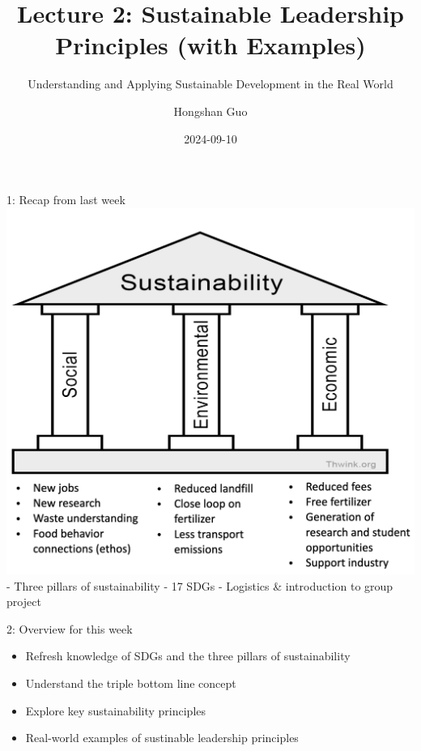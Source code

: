 \documentclass[
  ignorenonframetext,
]{beamer}
\title{Lecture 2: Sustainable Leadership Principles (with Examples)}
\subtitle{Understanding and Applying Sustainable Development in the Real
World}
\author{Hongshan Guo}
\date{2024-09-10}
\providecommand{\tightlist}{%
  \setlength{\itemsep}{0pt}\setlength{\parskip}{0pt}}\usepackage{longtable,booktabs,array}
\begin{document}
\frame{\titlepage}

\begin{frame}{1: Recap from last week}
\label{recap-from-last-week}
\includegraphics{asset/threepillars.png} - Three pillars of
sustainability - 17 SDGs - Logistics \& introduction to group project
\end{frame}

\begin{frame}{2: Overview for this week}
\label{overview-for-this-week}
\begin{itemize}
\tightlist
\item
  Refresh knowledge of SDGs and the three pillars of sustainability
\item
  Understand the triple bottom line concept
\item
  Explore key sustainability principles
\item
  Real-world examples of sustinable leadership principles
\end{itemize}
\end{frame}
\end{document}
